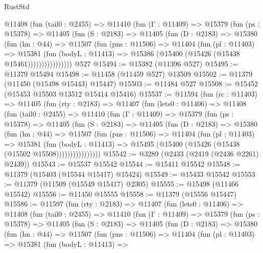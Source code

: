 \begin{lexlean}{RustStd}
\begin{coremodule}
          @11408
            (fun (tail0 : @2455) =>
            @11410
              (fun (Γ : @11409) =>
              @15379
                (fun (ps : @15378) =>
                @11405
                  (fun (S : @2183) =>
                  @11405
                    (fun (D : @2183) =>
                    @15380
                      (fun (hn : @44) =>
                      @11507
                        (fun (pns : @11506) =>
                        @11404
                          (fun (pl : @11403) =>
                          @15381
                            (fun (bodyL : @11413) =>
                            @15386 (@15400 (@15426 (@15438 @15461))))))))))))))))
    @527
@15494 := @15382 (@11396 @527)
@15495 := @11379 @15494
@15498 := @11458 (@11459 @527) @13509
@15502 := @11379 (@11450 (@15498 @15443) @15447)
@15503 := @11484 @527
@15508 := @15452 (@15453 @15503 @13512 @15414 @15416)
@15537 := @11594
    (fun (rc : @11403) =>
    @11405
      (fun (rty : @2183) =>
      @11407
        (fun (lets0 : @11406) =>
        @11408
          (fun (tail0 : @2455) =>
          @11410
            (fun (Γ : @11409) =>
            @15379
              (fun (ps : @15378) =>
              @11405
                (fun (S : @2183) =>
                @11405
                  (fun (D : @2183) =>
                  @15380
                    (fun (hn : @44) =>
                    @11507
                      (fun (pns : @11506) =>
                      @11404
                        (fun (pl : @11403) =>
                        @15381
                          (fun (bodyL : @11413) =>
                          @15495 (@15400 (@15426 (@15438 (@15502 @15508))))))))))))))))
@15542 := @3289 (@2433 (@2419 (@2436 @2261) @2439))
@15543 := @15537 @15542
@15544 := @15411 @15542
@15548 := @11379 (@15403 (@15544 @15417) @15424)
@15549 := @15433 @15542
@15553 := @11379 (@11509 (@15549 @15417) @2305)
@15555 := @15498 (@11466 @15542)
@15556 := @11450 @15555
@15558 := @11379 (@15556 @15447)
@15586 := @11597
    (fun (rty : @2183) =>
    @11407
      (fun (lets0 : @11406) =>
      @11408
        (fun (tail0 : @2455) =>
        @11410
          (fun (Γ : @11409) =>
          @15379
            (fun (ps : @15378) =>
            @11405
              (fun (S : @2183) =>
              @11405
                (fun (D : @2183) =>
                @15380
                  (fun (hn : @44) =>
                  @11507
                    (fun (pns : @11506) =>
                    @11404
                      (fun (pl : @11403) =>
                      @15381
                        (fun (bodyL : @11413) =>

\end{coremodule}
\end{lexlean}
